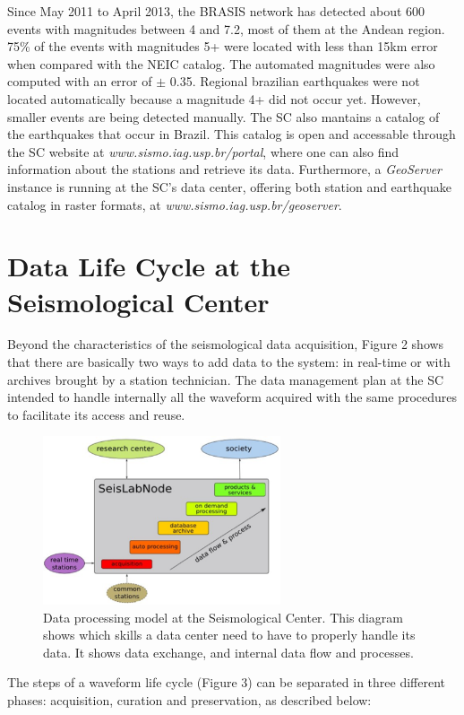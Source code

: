 \documentclass[twoside,letterpaper,twocolumn]{article}
\begin{document}
Since May 2011 to April 2013, the BRASIS network has detected about 600 events with magnitudes between 4 and 7.2, most of them at the Andean region. 75\% of the events with magnitudes 5+ were located with less than 15km error when compared with the NEIC catalog. The automated magnitudes were also computed with an error of  $ \pm $ 0.35. Regional brazilian earthquakes were not located automatically because a magnitude 4+ did not occur yet. However, smaller events are being detected manually. The SC also mantains a catalog of the earthquakes that occur in Brazil. This catalog is open and accessable through the SC website at \textit{www.sismo.iag.usp.br/portal}, where one can also find information about the stations and retrieve its data. Furthermore,  a \textit {GeoServer} instance is running at the SC's data center, offering both station and earthquake catalog in raster formats, at \textit{www.sismo.iag.usp.br/geoserver}.

\section{Data Life Cycle at the Seismological Center}

Beyond the characteristics of the seismological data acquisition, Figure 2 shows that there are basically two ways to add data to the system: in real-time or with archives brought by a station technician. The data management plan at the SC intended to handle internally all the waveform acquired with the same procedures to facilitate its access and reuse.

\begin{figure}[h!]
\centering
\includegraphics[width=7cm]{images/dataFlow.png}
\caption[Figure 2]{Data processing model at the Seismological Center. This diagram shows which skills a data center need to have to properly handle its data. It shows data exchange, and internal data flow and processes.}
\end{figure}

The steps of a waveform life cycle (Figure 3) can be separated in three different phases: acquisition, curation and preservation, as described below:
\end{document}
